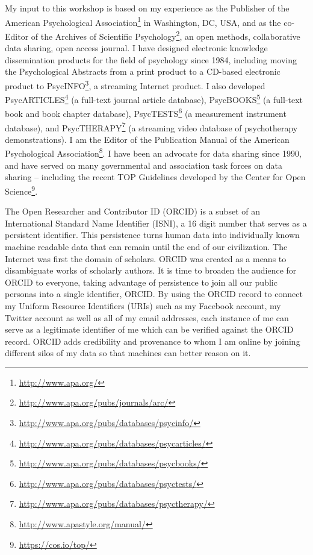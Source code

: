 \documentclass[a4paper,USenglish]{dagrep}
\begin{document}
{}
\license
My input to this workshop is based on my experience as the Publisher of the
American Psychological Association\footnote{\url{http://www.apa.org/}} in
Washington, DC, USA, and as the co-Editor of the Archives of Scientific
Psychology\footnote{\url{http://www.apa.org/pubs/journals/arc/}}, an open
methods, collaborative data sharing, open access journal.  I have designed
electronic knowledge dissemination products for the field of psychology since
1984, including moving the Psychological Abstracts from a print product to a
CD-based electronic product to
PsycINFO\footnote{\url{http://www.apa.org/pubs/databases/psycinfo/}}, a
streaming Internet product.  I also developed
PsycARTICLES\footnote{\url{http://www.apa.org/pubs/databases/psycarticles/}} (a
full-text journal article database),
PsycBOOKS\footnote{\url{http://www.apa.org/pubs/databases/psycbooks/}} (a
full-text book and book chapter database),
PsycTESTS\footnote{\url{http://www.apa.org/pubs/databases/psyctests/}} (a
measurement instrument database), and
PsycTHERAPY\footnote{\url{http://www.apa.org/pubs/databases/psyctherapy/}} (a
streaming video database of psychotherapy demonstrations).  I am the Editor of
the Publication Manual of the American Psychological
Association\footnote{\url{http://www.apastyle.org/manual/}}.  I have been an
advocate for data sharing since 1990, and have served on many governmental and
association task forces on data sharing – including the recent TOP Guidelines
developed by the Center for Open Science\footnote{\url{https://cos.io/top/}}.   


{}
\license
The Open Researcher and Contributor ID (ORCID) is a subset of an International 
Standard Name Identifier (ISNI), a 16 digit number that serves as a persistent 
identifier.  This persistence turns human data into individually known machine 
readable data that can remain until the end of our civilization.  The Internet was 
first the domain of scholars.  ORCID was created as a means to disambiguate 
works of scholarly authors.  It is time to broaden the audience for ORCID to 
everyone, taking advantage of persistence to join all our public personas into a 
single identifier, ORCID.  By using the ORCID record to connect my Uniform 
Resource Identifiers (URIs) such as my Facebook account, my Twitter account as 
well as all of my email addresses, each instance of me can serve as a legitimate 
identifier of me which can be verified against the ORCID record.  ORCID adds 
credibility and provenance to whom I am online by joining different silos of my 
data so that machines can better reason on it.
\end{document}
